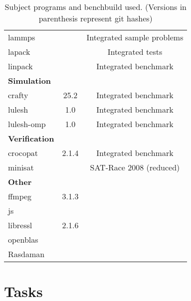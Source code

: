 \begin{table}[H]
\begin{tabularx}{\textwidth}{lcC}
        lammps &  & Integrated sample problems\\
        lapack & & Integrated tests\\
        linpack & & Integrated benchmark\\
        \midrule
        \textbf{Simulation}\\
        crafty & 25.2 & Integrated benchmark\\
        lulesh & 1.0 & Integrated benchmark\\
        lulesh-omp & 1.0 & Integrated benchmark\\
        \midrule
        \textbf{Verification}\\
        crocopat & 2.1.4 & Integrated benchmark\\
        minisat &  & SAT-Race 2008 (reduced)\\
        \midrule
        \textbf{Other}\\
        ffmpeg & 3.1.3\\
        js\\
        libressl & 2.1.6\\
        openblas & \\
        Rasdaman & \\
        \bottomrule
    \end{tabularx}
    \caption[Subject programs]{Subject programs and benchbuild used. (Versions in parenthesis represent git hashes)}
\end{table}

\section{Tasks}

